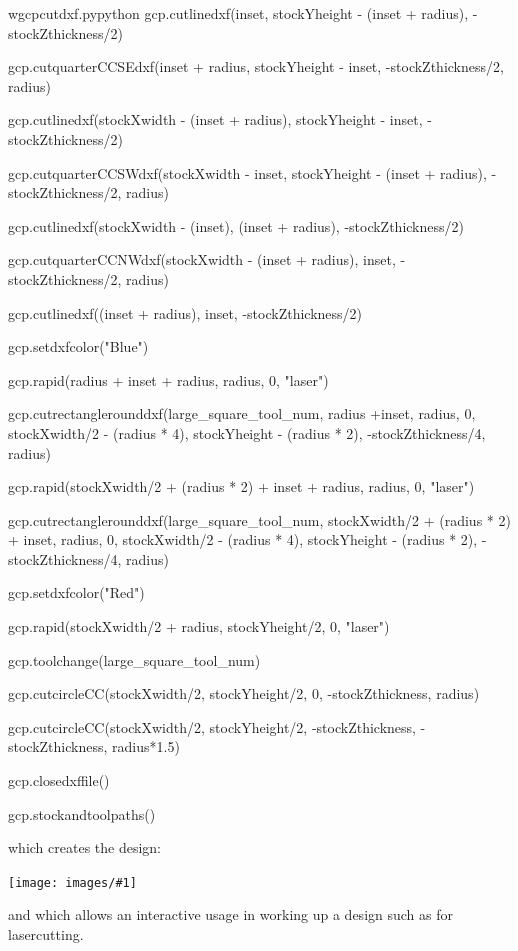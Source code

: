 \documentclass{ltxdoc}
\newcommand{\includeimage}[1]{\bigskip\noindent\texttt{[image: images/\#1]}\bigskip}
\begin{document}
\begin{writecode}{w}{gcpcutdxf.py}{python}
gcp.cutlinedxf(inset, stockYheight - (inset + radius), -stockZthickness/2)

gcp.cutquarterCCSEdxf(inset + radius, stockYheight - inset, -stockZthickness/2, radius)

gcp.cutlinedxf(stockXwidth - (inset + radius), stockYheight - inset, -stockZthickness/2)

gcp.cutquarterCCSWdxf(stockXwidth - inset, stockYheight - (inset + radius), -stockZthickness/2, radius)

gcp.cutlinedxf(stockXwidth - (inset), (inset + radius), -stockZthickness/2)

gcp.cutquarterCCNWdxf(stockXwidth - (inset + radius), inset, -stockZthickness/2, radius)

gcp.cutlinedxf((inset + radius), inset, -stockZthickness/2)

gcp.setdxfcolor("Blue")

gcp.rapid(radius + inset + radius, radius, 0, "laser")

gcp.cutrectanglerounddxf(large_square_tool_num, radius +inset, radius, 0, stockXwidth/2 - (radius * 4), stockYheight - (radius * 2), -stockZthickness/4, radius)

gcp.rapid(stockXwidth/2 + (radius * 2) + inset + radius, radius, 0, "laser")

gcp.cutrectanglerounddxf(large_square_tool_num, stockXwidth/2 + (radius * 2) + inset, radius, 0, stockXwidth/2 - (radius * 4), stockYheight - (radius * 2), -stockZthickness/4, radius)

gcp.setdxfcolor("Red")

gcp.rapid(stockXwidth/2 + radius, stockYheight/2, 0, "laser")

gcp.toolchange(large_square_tool_num)

gcp.cutcircleCC(stockXwidth/2, stockYheight/2, 0, -stockZthickness, radius)

gcp.cutcircleCC(stockXwidth/2, stockYheight/2, -stockZthickness, -stockZthickness, radius*1.5)

gcp.closedxffile()

gcp.stockandtoolpaths()


\end{writecode}

\noindent which creates the design:

\includeimage{gcpcutdxf.png}

\noindent and which allows an interactive usage in working up a design such as for lasercutting.
\end{document}
